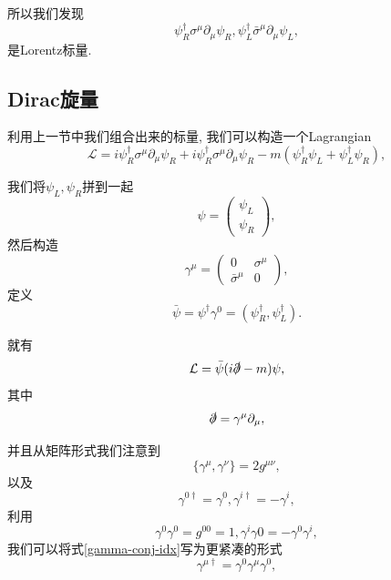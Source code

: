 所以我们发现
\begin{equation}
    \psi^\dagger_R\sigma^\mu\partial_\mu\psi_R, \psi^\dagger_L\bar\sigma^\mu\partial_\mu\psi_L,
\end{equation}
是Lorentz标量.

\subsection{Dirac旋量}
利用上一节中我们组合出来的标量, 我们可以构造一个Lagrangian
\begin{equation}
    \mathcal L=i\psi^\dagger_R\sigma^\mu\partial_\mu\psi_R+i\psi^\dagger_R\sigma^\mu\partial_\mu\psi_R-m(\psi_R^\dagger\psi_L+\psi_L^\dagger\psi_R),
\end{equation}

我们将$\psi_L, \psi_R$拼到一起
\begin{equation}
    \psi=\begin{pmatrix}
        \psi_L\\
        \psi_R
    \end{pmatrix},
\end{equation}
然后构造
\begin{equation}
    \gamma^\mu=\begin{pmatrix}
        0 & \sigma^\mu\\
        \bar\sigma^\mu & 0
    \end{pmatrix},
\end{equation}
定义
\begin{equation}
    \bar\psi=\psi^\dagger\gamma^0=(\psi_R^\dagger,\psi_L^\dagger).
\end{equation}

就有
\begin{equation}
    \mathcal L=\bar\psi(i\slashed\partial-m)\psi,
\end{equation}
其中
\begin{equation}
    \slashed\partial=\gamma^\mu\partial_\mu,
\end{equation}

并且从矩阵形式我们注意到
\begin{equation}
    \{\gamma^\mu, \gamma^\nu\}=2g^{\mu\nu},
\end{equation}
以及
\begin{equation}\label{gamma-conj-idx}
    \gamma^{0\dagger}=\gamma^0, \gamma^{i\dagger}=-\gamma^i,
\end{equation}
利用
\begin{equation}
    \gamma^0\gamma^0=g^{00}=1, \gamma^i\gamma0=-\gamma^0\gamma^i,
\end{equation}
我们可以将式\eqref{gamma-conj-idx}写为更紧凑的形式
\begin{equation}
    \gamma^{\mu\dagger}=\gamma^0\gamma^\mu\gamma^0,
\end{equation}

